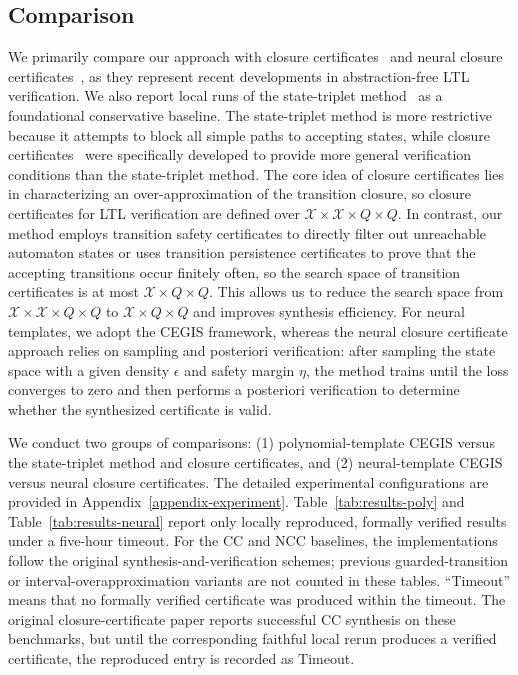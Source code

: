 \subsection{Comparison}
We primarily compare our approach with closure certificates~\cite{murali2024closure} and neural closure certificates~\cite{nadali2024neural}, as they represent recent developments in abstraction-free LTL verification. We also report local runs of the state-triplet method~\cite{wongpiromsarn2015automata} as a foundational conservative baseline. The state-triplet method is more restrictive because it attempts to block all simple paths to accepting states, while closure certificates~\cite{murali2024closure} were specifically developed to provide more general verification conditions than the state-triplet method. The core idea of closure certificates lies in characterizing an over-approximation of the transition closure, so closure certificates for LTL verification are defined over $\mathcal{X} \times \mathcal{X} \times Q \times Q$. In contrast, our method employs transition safety certificates to directly filter out unreachable automaton states or uses transition persistence certificates to prove that the accepting transitions occur finitely often, so the search space of transition certificates is at most $\mathcal{X} \times Q \times Q$. This allows us to reduce the search space from $\mathcal{X} \times \mathcal{X} \times Q \times Q$ to $\mathcal{X} \times Q \times Q$ and improves synthesis efficiency. For neural templates, we adopt the CEGIS framework, whereas the neural closure certificate approach relies on sampling and posteriori verification: after sampling the state space with a given density $\epsilon$ and safety margin $\eta$, the method trains until the loss converges to zero and then performs a posteriori verification to determine whether the synthesized certificate is valid.

We conduct two groups of comparisons: (1) polynomial-template CEGIS versus the state-triplet method and closure certificates, and (2) neural-template CEGIS versus neural closure certificates. The detailed experimental configurations are provided in Appendix~\ref{appendix-experiment}. Table~\ref{tab:results-poly} and Table~\ref{tab:results-neural} report only locally reproduced, formally verified results under a five-hour timeout. For the CC and NCC baselines, the implementations follow the original synthesis-and-verification schemes; previous guarded-transition or interval-overapproximation variants are not counted in these tables. ``Timeout'' means that no formally verified certificate was produced within the timeout. The original closure-certificate paper reports successful CC synthesis on these benchmarks, but until the corresponding faithful local rerun produces a verified certificate, the reproduced entry is recorded as Timeout.

